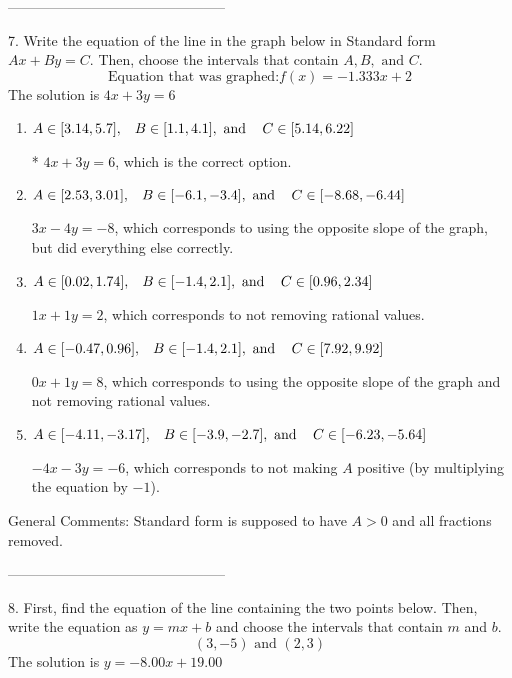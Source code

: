 \documentclass{article}[14pt]
\begin{document}
-----------------------------------------------

7. Write the equation of the line in the graph below in Standard form $Ax+By=C$. Then, choose the intervals that contain $A, B, \text{ and } C$.
$$ \text{Equation that was graphed:} f(x)= -1.333 x + 2 $$ 
The solution is $ 4 x + 3 y = 6 $ 

\begin{enumerate}[label=\Alph*.] 
\item $ A \in [3.14, 5.7], \hspace{3mm} B \in [1.1, 4.1], \text{ and } \hspace{3mm} C \in [5.14, 6.22] $ 

 * $4x + 3y = 6$, which is the correct option. 
\item $ A \in [2.53, 3.01], \hspace{3mm} B \in [-6.1, -3.4], \text{ and } \hspace{3mm} C \in [-8.68, -6.44] $ 

  $3x - 4y = -8$, which corresponds to using the opposite slope of the graph, but did everything else correctly. 
\item $ A \in [0.02, 1.74], \hspace{3mm} B \in [-1.4, 2.1], \text{ and } \hspace{3mm} C \in [0.96, 2.34] $ 

  $1x + 1y = 2$, which corresponds to not removing rational values. 
\item $ A \in [-0.47, 0.96], \hspace{3mm} B \in [-1.4, 2.1], \text{ and } \hspace{3mm} C \in [7.92, 9.92] $ 

  $0x + 1y = 8$, which corresponds to using the opposite slope of the graph and not removing rational values. 
\item $ A \in [-4.11, -3.17], \hspace{3mm} B \in [-3.9, -2.7], \text{ and } \hspace{3mm} C \in [-6.23, -5.64] $ 

  $-4x - 3y = -6$, which corresponds to not making $A$ positive (by multiplying the equation by $-1$). 
\end{enumerate} 
 
General Comments: Standard form is supposed to have $A > 0$ and all fractions removed.

-----------------------------------------------

8. First, find the equation of the line containing the two points below. Then, write the equation as $ y=mx+b $ and choose the intervals that contain $m$ and $b$.
$$ (3, -5) \text{ and } (2, 3) $$ 
The solution is $ y = -8.00x + 19.00 $ 
\end{document}
